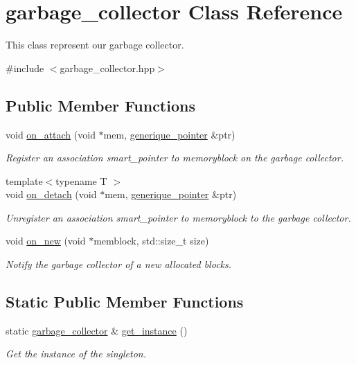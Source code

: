 \hypertarget{classgarbage__collector}{\section{garbage\-\_\-collector Class Reference}
\label{classgarbage__collector}
}


This class represent our garbage collector.  




{\ttfamily \#include $<$garbage\-\_\-collector.\-hpp$>$}

\subsection*{Public Member Functions}
\begin{DoxyCompactItemize}
\item 
void \hyperlink{classgarbage__collector_a09aba23f6c605cad9b8d06a68d1ccb3d}{on\-\_\-attach} (void $\ast$mem, \hyperlink{classgenerique__pointer}{generique\-\_\-pointer} \&ptr)
\begin{DoxyCompactList}\small\item\em Register an association smart\-\_\-pointer to memoryblock on the garbage collector. \end{DoxyCompactList}\item 
{\footnotesize template$<$typename T $>$ }\\void \hyperlink{classgarbage__collector_a03cb5dbdb08bbbb52a116b2499905fd2}{on\-\_\-detach} (void $\ast$mem, \hyperlink{classgenerique__pointer}{generique\-\_\-pointer} \&ptr)
\begin{DoxyCompactList}\small\item\em Unregister an association smart\-\_\-pointer to memoryblock to the garbage collector. \end{DoxyCompactList}\item 
void \hyperlink{classgarbage__collector_a7819a3496e0090520bcf8504f8a1fa6e}{on\-\_\-new} (void $\ast$memblock, std\-::size\-\_\-t size)
\begin{DoxyCompactList}\small\item\em Notify the garbage collector of a new allocated blocks. \end{DoxyCompactList}\end{DoxyCompactItemize}
\subsection*{Static Public Member Functions}
\begin{DoxyCompactItemize}
\item 
\hypertarget{classgarbage__collector_a006a84658a8b06f5f0adf151b9909edc}{static \hyperlink{classgarbage__collector}{garbage\-\_\-collector} \& \hyperlink{classgarbage__collector_a006a84658a8b06f5f0adf151b9909edc}{get\-\_\-instance} ()}\label{classgarbage__collector_a006a84658a8b06f5f0adf151b9909edc}

\begin{DoxyCompactList}\small\item\em Get the instance of the singleton. \end{DoxyCompactList}\end{DoxyCompactItemize}


